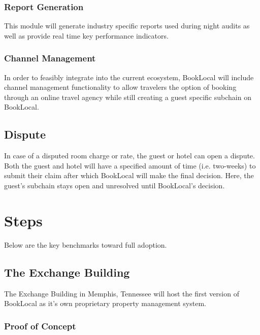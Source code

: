 \documentclass{article}
\begin{document}
\subsubsection{Report Generation}
This module will generate industry specific reports used during night audits as well as provide real time key performance indicators.  

\subsubsection{Channel Management}
In order to feasibly integrate into the current ecosystem, BookLocal will include channel management functionality to allow travelers the option of booking through an online travel agency while still creating a guest specific subchain on BookLocal.   

\subsection{Dispute}
In case of a disputed room charge or rate, the guest or hotel can open a dispute. Both the guest and hotel will have a specified amount of time (i.e. two-weeks) to submit their claim after which BookLocal will make the final decision. Here, the guest's subchain stays open and unresolved until BookLocal's decision.


\newpage
\section{Steps}
Below are the key benchmarks toward full adoption. 

\subsection{The Exchange Building}
The Exchange Building in Memphis, Tennessee will host the first version of BookLocal as it's own proprietary property management system. 

\subsubsection{Proof of Concept}
\end{document}
